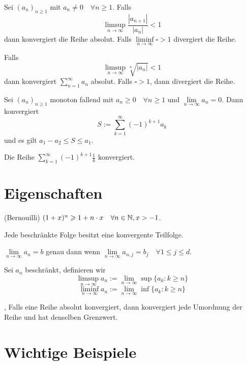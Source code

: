 \Satz[Ratio] Sei $\left(a_{n}\right)_{n \geqslant 1}$ mit $a_{n} \neq 0 \quad \forall n \geqslant 1 .$ Falls 
$$\limsup\limits_{n \rightarrow \infty} \frac{\left|a_{n+1}\right|}{\left|a_{n}\right|}<1$$ dann konvergiert die Reihe absolut.
Falls $\liminf\limits_{n \rightarrow \infty}\square > 1$ divergiert die Reihe.

\Satz[Root] Falls $$\limsup\limits_{n \rightarrow \infty} \sqrt[n]{\left|a_{n}\right|}<1$$ dann konvergiert $\sum_{n=1}^{\infty} a_{n}$ absolut. Falls $\square > 1$, dann divergiert die Reihe.

\Satz[Alternating] Sei $\left(a_{n}\right)_{n \geqslant 1}$ monoton fallend mit $a_{n} \geqslant 0 \quad \forall n \geqslant 1$ und $\lim \limits_{n \rightarrow \infty} a_{n}=0 .$ Dann konvergiert 
$$S:=\sum_{k=1}^{\infty}(-1)^{k+1} a_{k}$$ und es gilt $a_{1}-a_{2} \leqslant S \leqslant a_{1}$.

\Bsp Die Reihe $\sum_{k=1}^{\infty}(-1)^{k+1} \frac{1}{k}$ konvergiert.


\section{Eigenschaften}
\Lemma (Bernouilli) $(1+x)^{n} \geqslant 1+n \cdot x \quad \forall n \in \mathbb{N}, x>-1$.

\Satz[Teilfolge] Jede beschränkte Folge besitzt eine konvergente Teilfolge.

\Satz[Vektorfolge] $\lim \limits_{n \rightarrow \infty} a_{n}=b$ genau dann wenn $\lim \limits_{n \rightarrow \infty} a_{n, j}=b_{j} \quad \forall 1 \leqslant j \leqslant d$.

 Sei $a_n$ beschränkt, definieren wir
$$\limsup\limits_{n \rightarrow \infty} a_n := \lim \limits_{n \rightarrow \infty} \sup \{a_k : k\geqslant n\}$$
$$\liminf\limits_{n \rightarrow \infty} a_n := \lim \limits_{n \rightarrow \infty} \inf \{a_k : k\geqslant n\}$$

\sep
\Satz[Umordnung] Falls eine Reihe absolut konvergiert, dann konvergiert jede
Umordnung der Reihe und hat denselben Grenzwert.



\section{Wichtige Beispiele}

